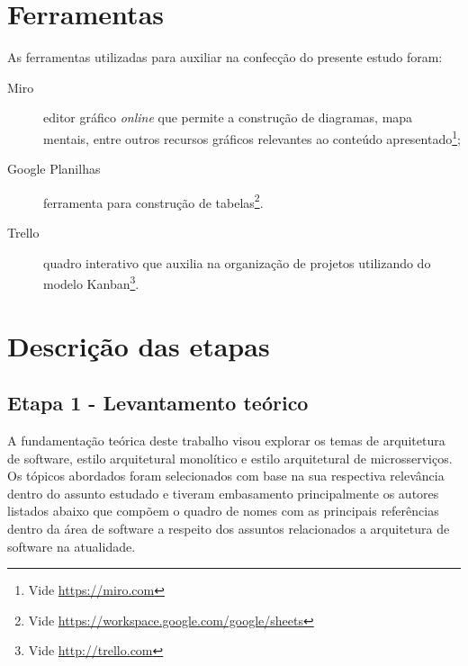 \section{Ferramentas}

As ferramentas utilizadas para auxiliar na confecção do presente estudo foram:

\begin{description}
    \item[Miro] editor gráfico \textit{online} que permite a construção de diagramas, mapa mentais, entre
        outros recursos gráficos relevantes ao conteúdo apresentado\footnote{Vide \url{https://miro.com}};
    \item[Google Planilhas] ferramenta para construção de tabelas\footnote{Vide \url{https://workspace.google.com/google/sheets}}.
    \item[Trello] quadro interativo que auxilia na organização de projetos utilizando do modelo
        Kanban\footnote{Vide \url{http://trello.com}}.
\end{description}

\section{Descrição das etapas}
\subsection{Etapa 1 - Levantamento teórico}

A fundamentação teórica deste trabalho visou explorar os temas de arquitetura de software,
estilo arquitetural monolítico e estilo arquitetural de microsserviços. Os tópicos abordados foram
selecionados com base na sua respectiva relevância dentro do assunto estudado e tiveram embasamento
principalmente os autores listados abaixo que compõem o quadro de nomes com as principais referências
dentro da área de software a respeito dos assuntos relacionados a arquitetura de software na
atualidade.

